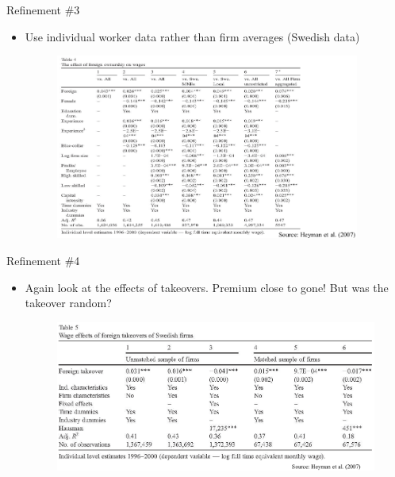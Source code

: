 \documentclass[10pt,hyperref={CJKbookmarks=true},xcolor=dvipsnames,aspectratio=169]{beamer}
\begin{document}
\begin{frame}{Refinement \#3 }

\begin{itemize}
\item Use individual worker data rather than firm averages (Swedish data)
\begin{figure}


\begin{centering}
\includegraphics[width=10cm]{fig/fdi/lec7-15}
\par\end{centering}

\end{figure}

\end{itemize}
\end{frame}

\begin{frame}{Refinement \#4 }

\begin{itemize}
\item Again look at the effects of takeovers. Premium close to gone! But
was the takeover random? 
\begin{figure}


\centering{}\includegraphics[width=11cm]{fig/fdi/lec7-16}
\end{figure}

\end{itemize}
\end{frame}
\end{document}
